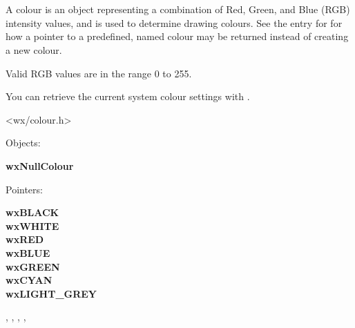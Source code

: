 
\section{}\label{wxcolour}

A colour is an object representing a combination of Red, Green, and Blue (RGB) intensity values,
and is used to determine drawing colours. See the
entry for  for how a pointer to a predefined,
named colour may be returned instead of creating a new colour.

Valid RGB values are in the range 0 to 255.

You can retrieve the current system colour settings with .




<wx/colour.h>


Objects:

{\bf wxNullColour}

Pointers:

{\bf wxBLACK\\
wxWHITE\\
wxRED\\
wxBLUE\\
wxGREEN\\
wxCYAN\\
wxLIGHT\_GREY}


, , ,\rtfsp
{}, 



\label{wxcolourconstr}



